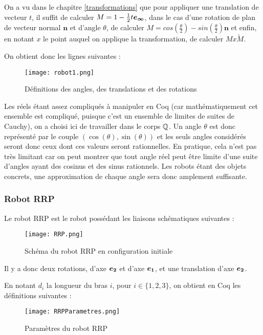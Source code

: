 On a vu dans le chapitre \ref{transformations} que pour appliquer une translation de vecteur $t$, il suffit de calculer $M =  1-\frac{1}{2}t\bm{e_{\infty}}$, dans le cas d'une rotation de plan de vecteur normal $\bm{n}$ et d'angle $\theta$, de calculer $M=cos\left(\frac{\theta}{2}\right)-sin \left(\frac{\theta}{2}\right)\bm{n}$ et enfin, en notant $x$ le point auquel on applique la transformation, de calculer $Mx\tilde{M}$.

On obtient donc les lignes suivantes :

\begin{figure}[!ht]
\centering
\texttt{[image: robot1.png]}
\caption{Définitions des angles, des translations et des rotations}
\end{figure}

Les réels étant assez compliqués à manipuler en Coq (car mathématiquement cet ensemble est compliqué, puisque c'est un ensemble de limites de suites de Cauchy), on a choisi ici de travailler dans le corps $\mathbb{Q}$. Un angle $\theta$ est donc représenté par le couple $(\cos(\theta), \sin(\theta))$ et les seuls angles considérés seront donc ceux dont ces valeurs seront rationnelles. En pratique, cela n'est pas très limitant car on peut montrer que tout angle réel peut être limite d'une suite d'angles ayant des cosinus et des sinus rationnels. Les robots étant des objets concrets, une approximation de chaque angle sera donc amplement suffisante.

\subsubsection{Robot RRP}

Le robot RRP est le robot possédant les liaisons schématiques suivantes : 

\begin{figure}[!ht]
\centering
\texttt{[image: RRP.png]}
\caption{Schéma du robot RRP en configuration initiale}
\end{figure}

Il y a donc deux rotations, d'axe $\bm{e_{2}}$ et d'axe $\bm{e_{1}}$, et une translation d'axe $\bm{e_{2}}$. 

En notant $d_i$ la longueur du bras $i$, pour $i\in \lbrace 1,2,3 \rbrace$, on obtient en Coq les définitions suivantes : 

\begin{figure}[!ht]
\centering
\texttt{[image: RRPParametres.png]}
\caption{Paramètres du robot RRP}
\end{figure}

